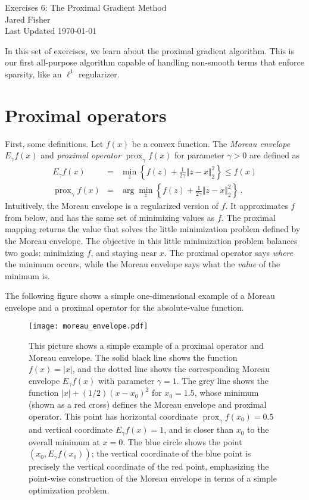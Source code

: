 \documentclass{article}
\newcommand{\prox}{ \mathop{\mathrm{prox}} }
\newcommand{\enorm}[1]{\Vert #1 \Vert_2}
\begin{document}
\large 
\begin{center}
Exercises 6: The Proximal Gradient Method\\
\vspace{10pt}
Jared Fisher\\
Last Updated \today
\end{center}
\normalsize


\bigskip


In this set of exercises, we learn about the proximal gradient algorithm.  This is our first all-purpose algorithm capable of handling non-smooth terms that enforce sparsity, like an $\ell^1$ regularizer.

\section{Proximal operators}

First, some definitions.  Let $f(x)$ be a convex function.  The \textit{Moreau envelope} $E_{\gamma} f(x)$ and \textit{proximal operator} $\prox_{\gamma} f(x)$ for parameter $\gamma > 0$ are defined as
\begin{eqnarray}
E_{\gamma} f(x) &=& \min_{z } \left\{f(z) + \frac{1}{2\gamma} \enorm{z - x}^2  \right\}  \leq f(x) \\
\prox_{\gamma} f(x) &=& \arg \min_{z } \left\{  f(z)+ \frac{1}{2\gamma} \enorm{z - x}^2  \right\} \, .
\end{eqnarray}
Intuitively, the Moreau envelope is a regularized version of $f$.  It approximates $f$ from below, and has the same set of minimizing values as $f$.  The proximal mapping returns the value that solves the little minimization problem defined by the Moreau envelope.  The objective in this little minimization problem balances two goals: minimizing $f$, and staying near $x$.  The proximal operator says \textit{where} the minimum occurs, while the Moreau envelope says what the \textit{value} of the minimum is.

The following figure shows a simple one-dimensional example of a Moreau envelope and a proximal operator for the absolute-value function.

\begin{figure}
\centering
\texttt{[image: moreau\_envelope.pdf]}
\caption{This picture shows a simple example of a proximal operator and Moreau envelope.  The solid black line shows the function $f(x) = |x|$, and the dotted line shows the corresponding Moreau envelope $E_{\gamma} f (x)$ with parameter $\gamma=1$.  The grey line shows the function 
  $|x| + (1/2)(x-x_0)^2$ for $x_0 = 1.5$, whose minimum (shown as a red cross)
  defines the Moreau envelope and proximal operator.  This point has horizontal coordinate
  $\prox_\gamma f(x_0) = 0.5$ and vertical coordinate $E_{\gamma} f (x) = 1$, and is closer than $x_0$
  to the overall minimum at $x=0$.  The blue circle shows the point 
  $(x_0, E_{\gamma} f (x_0))$; the vertical coordinate of the blue point is precisely the vertical coordinate of the red point, emphasizing the point-wise construction of the Moreau
  envelope in terms of a simple optimization problem.
}
\end{figure}
\end{document}
